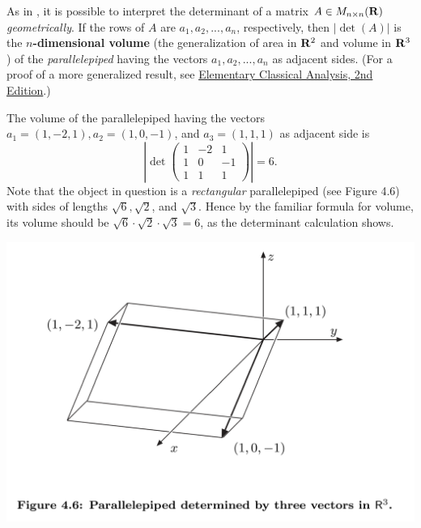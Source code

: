 \begin{remark}
As in , it is possible to interpret the determinant of a matrix \(A \in M_{n \times n}(\mathbf{R})\) \emph{geometrically}.
If the rows of \(A\) are \(a_1, a_2, ..., a_{n}\), respectively,
then \(\left| \det(A) \right|\) is the \textbf{\(n\)-dimensional volume} (the generalization of area in \(\mathbf{R}^2\) and volume in \(\mathbf{R}^3\)) of the \emph{parallelepiped} having the vectors \(a_1, a_2, ..., a_n\) as adjacent sides.
(For a proof of a more generalized result, see \href{https://www.amazon.com/-/zh_TW/Jerrold-Marsden/dp/0716721058/ref=sr_1_1}{Elementary Classical Analysis, 2nd Edition}.)
\end{remark}

\begin{example} \label{example 4.3.2}
The volume of the parallelepiped having the vectors \(a_1 = (1, -2, 1), a_2 = (1, 0, -1)\), and \(a_3 = (1, 1, 1)\) as adjacent side is
\[
    \left|
        \det \begin{pmatrix}
            1 & -2 & 1 \\
            1 & 0 & -1 \\
            1 & 1 & 1
        \end{pmatrix}
    \right| = 6.
\]
Note that the object in question is a \emph{rectangular} parallelepiped (see Figure 4.6) with sides of lengths \(\sqrt{6}, \sqrt{2}\), and \(\sqrt{3}\).
Hence by the familiar formula for volume, its volume should be \(\sqrt{6} \cdot \sqrt{2} \cdot \sqrt{3} = 6\), as the determinant calculation shows.
\end{example}

\includegraphics[width=16cm]{images/figure-4.6.png}

